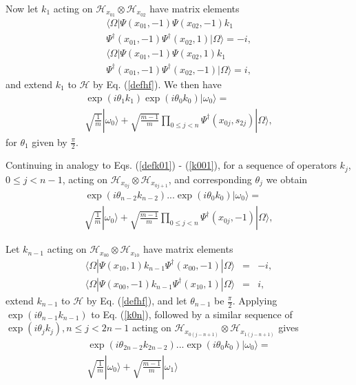 \documentclass[12pt,amsmath,amssymb,onecolumn]{revtex4-2}
\begin{document}
Now let $k_{1}$ acting on $\mathcal{H}_{x_{01}} \otimes \mathcal{H}_{x_{02}}$
have matrix elements
\begin{multline}
\label{defk011}
 \langle  \Omega| \Psi( x_{01}, -1) \Psi( x_{02}, -1) k_1  \\
\Psi^{\dagger}(x_{01},-1) \Psi^{\dagger}( x_{02}, 1)|\Omega \rangle  = -i,
\end{multline}
\begin{multline}
\label{defk101}
 \langle  \Omega| \Psi(x_{01},-1) \Psi( x_{02}, 1) k_1
 \\ \Psi^{\dagger}(x_{01},-1) \Psi^{\dagger}( x_{02},-1)|\Omega \rangle  = i,
\end{multline}
and extend $k_1$ to $\mathcal{H}$ by Eq. (\ref{defhf}).
We then have
\begin{multline}
\label{k001}
\exp( i \theta_1 k_1) \exp( i \theta_0 k_0)|\omega_0 \rangle  = \\
\sqrt{\frac{1}{m}} |\omega_0 \rangle  +
\sqrt{\frac{m - 1}{m}} \prod_{0 \le j < n} \Psi^{\dagger}( x_{0j}, s_{2j}) |\Omega \rangle ,
\end{multline}
for $\theta_1$ given by $\frac{\pi}{2}$.


Continuing in analogy to Eqs. (\ref{defk01}) - (\ref{k001}),
for a sequence of operators $k_j$, $0 \le j < n-1$, acting on
$\mathcal{H}_{x_{0j}} \otimes \mathcal{H}_{x_{0j+1}}$, and corresponding
$\theta_j$ we obtain
\begin{multline}
\label{k0n}
\exp( i \theta_{n-2} k_{n-2}) ... \exp( i \theta_0 k_0) |\omega_0 \rangle  = \\
\sqrt{\frac{1}{m}} |\omega_0 \rangle  +
\sqrt{\frac{m - 1}{m}} \prod_{0 \le j < n} \Psi^{\dagger}( x_{0j}, -1) |\Omega \rangle ,
\end{multline}

Let $k_{n-1}$ acting on $\mathcal{H}_{x_{00}} \otimes \mathcal{H}_{x_{10}}$
have matrix elements
\begin{subequations}
\begin{eqnarray}
\label{defknm1}
 \langle  \Omega| \Psi( x_{10}, 1) k_{n-1}  \Psi^{\dagger}(x_{00},-1)|\Omega \rangle  &=& -i, \\
\label{defknm11}
 \langle  \Omega| \Psi(x_{00},-1)  k_{n-1} \Psi^{\dagger}( x_{10},1)|\Omega \rangle  &=& i,
\end{eqnarray}
\end{subequations}
extend $k_{n-1}$ to $\mathcal{H}$ by Eq. (\ref{defhf}),
and let $\theta_{n-1}$ be $\frac{\pi}{2}$.
Applying $\exp(i \theta_{n-1} k_{n-1})$ to Eq. (\ref{k0n}),
followed by a similar sequence of $\exp(i \theta_j k_j), n \le j < 2n -1$ acting on
$\mathcal{H}_{x_{0(j-n+1)}} \otimes \mathcal{H}_{x_{1(j-n+1)}}$ gives
\begin{multline}
\label{k02n}
\exp( i \theta_{2n-2} k_{2n-2}) ... \exp( i \theta_0 k_0) |\omega_0 \rangle  = \\
\sqrt{\frac{1}{m}} |\omega_0 \rangle  +
\sqrt{\frac{m - 1}{m}} |\omega_1 \rangle 
\end{multline}
\end{document}

